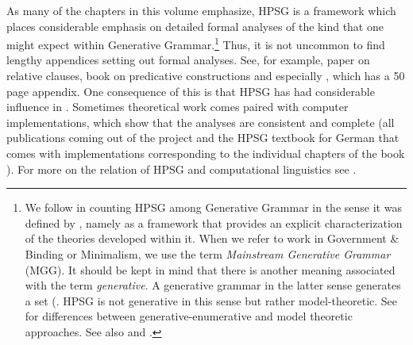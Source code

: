 \documentclass[output=paper]{langsci/langscibook}
\begin{document}
As many of the chapters in this volume emphasize, HPSG is a framework which places considerable
emphasis on detailed formal analyses of the kind that one might expect within Generative
Grammar.\footnote{%
We follow \citet[]{GSag2000a-u} in counting HPSG among Generative Grammar in the sense it was
defined by \citet[]{Chomsky65a}, namely as a framework that provides an explicit
characterization of the theories developed within it.
When we refer to work in Government \& Binding or Minimalism, we use
the term \emph{Mainstream Generative Grammar} (MGG). It should be kept in mind that there is another
meaning associated with the term \emph{generative}. A generative grammar in the latter sense
generates a set (\citealp[]{Chomsky57a}. HPSG is not generative in this sense but rather model-theoretic. See \citet{PS2001a}
for differences between generative-enumerative and model theoretic approaches. See also
 and .
}
Thus, it is not uncommon to find lengthy appendices setting out formal analyses. See, for
example,  paper on  relative clauses,
 book on predicative constructions and especially \citet{GSag2000a-u},
which has a 50 page appendix. One consequence of this is that HPSG has had 
considerable influence in . Sometimes theoretical work comes paired
with computer implementations, which show that the analyses are consistent and complete (\eg all
publications coming out of the  project \citep{MuellerCoreGram} and the HPSG textbook
for German that comes with implementations corresponding to the individual chapters of the book
\citep{MuellerGrammix}). For more on the relation of HPSG and computational linguistics see
.
\end{document}
